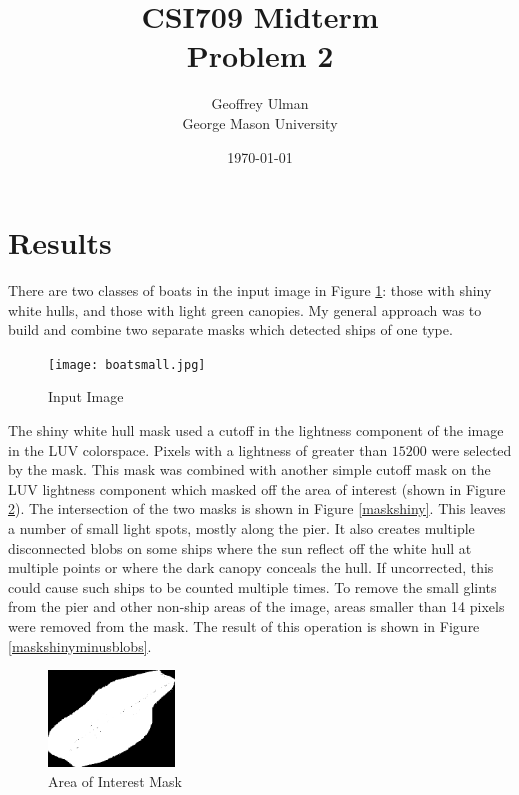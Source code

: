 \documentclass[12pt]{article}
\begin{document}
\title{CSI709 Midterm \\
Problem 2}
\author{
        Geoffrey Ulman \\
        George Mason University\\
}
\date{\today}

\maketitle

\section{Results}

There are two classes of boats in the input image in Figure \ref{boats}: those with shiny white hulls, and those with light green canopies. My general approach was to build and combine two separate masks which detected ships of one type.

\begin{figure}
\centering
\texttt{[image: boatsmall.jpg]}
\caption{Input Image}
\label{boats}
\end{figure}

The shiny white hull mask used a cutoff in the lightness component of the image in the LUV colorspace. Pixels with a lightness of greater than \(15200\) were selected by the mask. This mask was combined with another simple cutoff mask on the LUV lightness component which masked off the area of interest (shown in Figure \ref{bordermask}). The intersection of the two masks is shown in Figure \ref{maskshiny}. This leaves a number of small light spots, mostly along the pier. It also creates multiple disconnected blobs on some ships where the sun reflect off the white hull at multiple points or where the dark canopy conceals the hull. If uncorrected, this could cause such ships to be counted multiple times. To remove the small glints from the pier and other non-ship areas of the image, areas smaller than 14 pixels were removed from the mask. The result of this operation is shown in Figure \ref{maskshinyminusblobs}.

\begin{figure}
\centering
\includegraphics[width=0.30\textwidth]{border_mask.png}
\caption{Area of Interest Mask}
\label{bordermask}
\end{figure}
\end{document}
